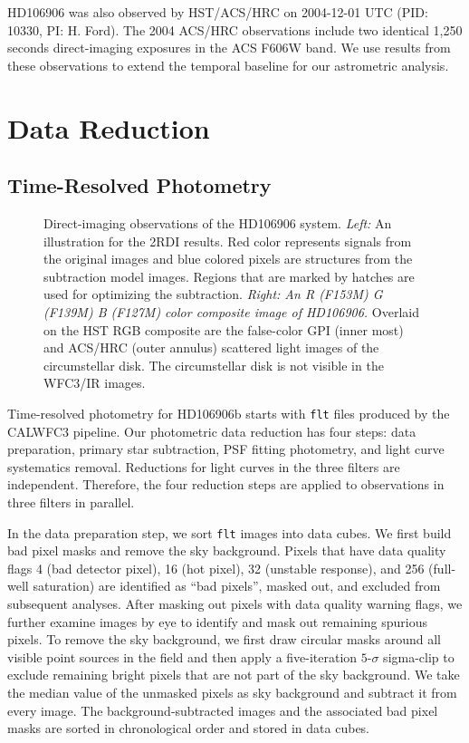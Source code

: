 \documentclass[twocolumn]{aastex62}
\begin{document}
HD106906 was also observed by HST/ACS/HRC on 2004-12-01 UTC (PID: 10330, PI: H. Ford). The 2004 ACS/HRC observations include two identical 1,250 seconds direct-imaging exposures in the ACS F606W  band. We use results  from these observations \citep{Bailey2013,Kalas2015} to extend the temporal baseline for our astrometric analysis.

\section{Data Reduction}

\subsection{Time-Resolved Photometry}
\begin{figure}
  \centering
{}  
  \caption{Direct-imaging observations of the HD106906 system. \emph{Left:} An illustration for the 2RDI results. Red color represents signals from the original images and blue colored pixels are structures from the subtraction model images. Regions that are marked by hatches are used for optimizing the subtraction. \emph{Right: An R (F153M) G (F139M) B (F127M) color composite image of HD106906.} Overlaid on the HST RGB composite are the false-color GPI (inner most) and ACS/HRC (outer annulus) scattered light images \citep{Kalas2015} of the circumstellar disk. The circumstellar disk is not visible in the WFC3/IR images.}
  \label{fig:2rdi}
\end{figure}

Time-resolved photometry for HD106906b starts with \texttt{flt} files produced by the CALWFC3 pipeline. Our photometric data reduction has four steps: data preparation, primary star subtraction, PSF fitting photometry, and light curve systematics removal. Reductions for light curves in the three filters are independent. Therefore, the four reduction steps are applied to observations in three filters in parallel. 

In the data preparation step, we sort \texttt{flt} images into data cubes. We first build bad pixel masks and remove the sky background. Pixels that have data quality flags 4 (bad detector pixel), 16 (hot pixel), 32 (unstable response), and 256 (full-well saturation) are identified as ``bad pixels'', masked out, and excluded from subsequent analyses. After masking out pixels with data quality warning flags, we further examine images by eye to identify and mask out remaining spurious pixels. To remove the sky background, we first draw circular masks around all visible point sources in the field and then apply a five-iteration $5\mbox{-}\sigma$ sigma-clip to exclude remaining bright pixels that are not part of the sky background. We take the median value of the unmasked pixels as sky background and subtract it from every image. The background-subtracted images and the associated bad pixel masks are sorted in chronological order and stored in data cubes.
\end{document}
